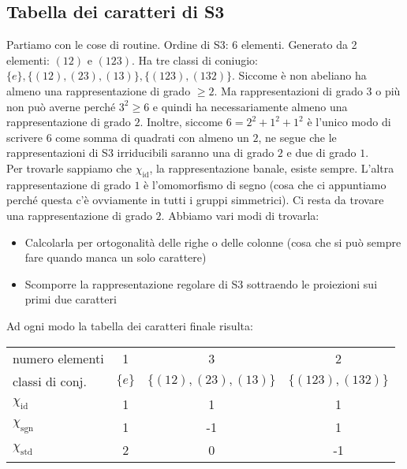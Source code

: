 \documentclass[a4paper,NoNotes,GeneralMath]{stdmdoc}
\begin{document}
	\subsection{Tabella dei caratteri di S3}
	Partiamo con le cose di routine. Ordine di S3: 6 elementi. Generato da 2 elementi: $(1 2)$ e $(1 2 3)$. Ha tre classi di coniugio: $\{e\}, \{(1 2), (2 3), (1 3)\}, \{(1 2 3), (1 3 2)\}$. Siccome è non abeliano ha almeno una rappresentazione di grado $\ge 2$. Ma rappresentazioni di grado $3$ o più non può averne perché $3^2 \ge 6$ e quindi ha necessariamente almeno una rappresentazione di grado $2$. Inoltre, siccome $6 = 2^2 + 1^2 + 1^2$ è l'unico modo di scrivere $6$ come somma di quadrati con almeno un $2$, ne segue che le rappresentazioni di S3 irriducibili saranno una di grado $2$ e due di grado $1$. \\
	Per trovarle sappiamo che $\chi_{\text{id}}$, la rappresentazione banale, esiste sempre. L'altra rappresentazione di grado $1$ è l'omomorfismo di segno (cosa che ci appuntiamo perché questa c'è ovviamente in tutti i gruppi simmetrici). Ci resta da trovare una rappresentazione di grado $2$. Abbiamo vari modi di trovarla:
		\begin{itemize}
			\item Calcolarla per ortogonalità delle righe o delle colonne (cosa che si può sempre fare quando manca un solo carattere)
			\item Scomporre la rappresentazione regolare di S3 sottraendo le proiezioni sui primi due caratteri
		\end{itemize}
	Ad ogni modo la tabella dei caratteri finale risulta: \\
	\begin{center} \begin{tabular}{lccc}
	numero elementi   & 1   & 3   & 2   \\ 
	classi di conj.   & $\{e\}$  &  $\{(1 2), (2 3), (1 3)\}$  & $\{(1 2 3), (1 3 2)\}$ \\ \hline
	$\chi_\text{id}$  & 1   & 1   & 1   \\
	$\chi_\text{sgn}$ & 1   & -1  & 1   \\
	$\chi_\text{std}$ & 2   & 0   & -1  \\
	\end{tabular} \end{center} \vskip 0.5cm
\end{document}
